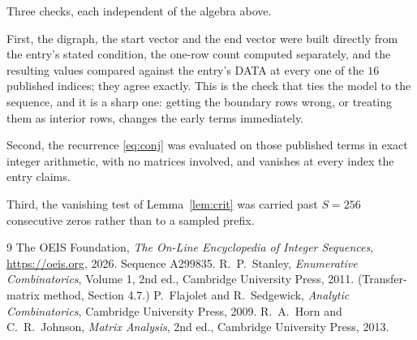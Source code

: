 \documentclass[11pt,a4paper]{article}
\theoremstyle{plain}
\theoremstyle{definition}
\begin{document}
Three checks, each independent of the algebra above.

First, the digraph, the start vector and the end vector were built directly from the
entry's stated condition, the one-row count computed separately, and the resulting values
compared against the entry's DATA at every one of the $16$ published indices; they
agree exactly. This is the check that ties the model to the sequence, and it is a sharp one:
getting the boundary rows wrong, or treating them as interior rows, changes the early terms
immediately.

Second, the recurrence \eqref{eq:conj} was evaluated on those published terms in exact
integer arithmetic, with no matrices involved, and vanishes at every index the entry claims.

Third, the vanishing test of Lemma~\ref{lem:crit} was carried past $S=256$ consecutive
zeros rather than to a sampled prefix.

\begin{thebibliography}{9}
 The OEIS Foundation, \emph{The On-Line Encyclopedia of Integer
Sequences}, \url{https://oeis.org}, 2026. Sequence A299835.
 R.~P.~Stanley, \emph{Enumerative Combinatorics}, Volume 1, 2nd ed.,
Cambridge University Press, 2011. (Transfer-matrix method, Section 4.7.)
 P.~Flajolet and R.~Sedgewick, \emph{Analytic Combinatorics}, Cambridge
University Press, 2009.
 R.~A.~Horn and C.~R.~Johnson, \emph{Matrix Analysis}, 2nd ed., Cambridge
University Press, 2013.
\end{thebibliography}
\end{document}
